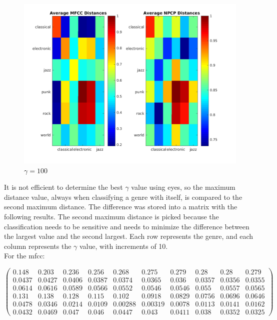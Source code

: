 \documentclass[11pt, a4paper]{article}
\begin{document}
\begin{figure}[H]
\hspace*{-2cm}    
    \centering
    \includegraphics[width=1.25\textwidth]{average100.png}
    \caption{$\gamma = 100$}
\end{figure}


It is not efficient to determine the best $\gamma$ value using eyes, so the maximum distance value, always when classifying a genre with itself, is compared to the second maximum distance. The difference was stored into a matrix with the following results. The second maximum distance is picked because the classification needs to be sensitive and needs to minimize the difference between the largest value and the second largest. Each row represents the genre, and each column represents the $\gamma$ value, with increments of 10. \\

For the mfcc:

$\left(\begin{array}{cccccccccc} 0.148 & 0.203 & 0.236 & 0.256 & 0.268 & 0.275 & 0.279 & 0.28 & 0.28 & 0.279\\ 0.0437 & 0.0427 & 0.0406 & 0.0387 & 0.0374 & 0.0365 & 0.036 & 0.0357 & 0.0356 & 0.0355\\ 0.0614 & 0.0616 & 0.0589 & 0.0566 & 0.0552 & 0.0546 & 0.0546 & 0.055 & 0.0557 & 0.0565\\ 0.131 & 0.138 & 0.128 & 0.115 & 0.102 & 0.0918 & 0.0829 & 0.0756 & 0.0696 & 0.0646\\ 0.0478 & 0.0346 & 0.0214 & 0.0109 & 0.00288 & 0.00319 & 0.0078 & 0.0113 & 0.0141 & 0.0162\\ 0.0432 & 0.0469 & 0.047 & 0.046 & 0.0447 & 0.043 & 0.0411 & 0.038 & 0.0352 & 0.0325 \end{array}\right)$ \\
\end{document}
